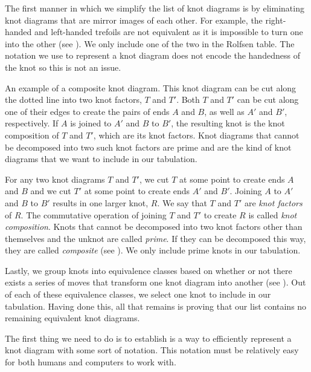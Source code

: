 \begin{paper}
The first manner in which we simplify the list of knot diagrams is by
eliminating knot diagrams that are mirror images of each other.
For example, the right-handed and left-handed trefoils are not equivalent as it
is impossible to turn one into the other (see \figTrefoil).
We only include one of the two in the Rolfsen table.
The notation we use to represent a knot diagram does not encode the handedness
of the knot so this is not an issue.\\

{\begin{center}\end{center}\vspace{-1em}}
{An example of a composite knot diagram.
This knot diagram can be cut along the dotted line into two knot factors, $T$
and $T'$.
Both $T$ and $T'$ can be cut along one of their edges to create the pairs of
ends $A$ and $B$, as well as $A'$ and $B'$, respectively.
If $A$ is joined to $A'$ and $B$ to $B'$, the resulting knot is the knot
composition of $T$ and $T'$, which are its knot factors.
Knot diagrams that cannot be decomposed into two such knot factors are prime and
are the kind of knot diagrams that we want to include in our tabulation.}

For any two knot diagrams $T$ and $T'$, we cut $T$ at some point to create ends
$A$ and $B$ and we cut $T'$ at some point to create ends $A'$ and $B'$.
Joining $A$ to $A'$ and $B$ to $B'$ results in one larger knot, $R$.
We say that $T$ and $T'$ are \textit{knot factors} of $R$.
The commutative operation of joining $T$ and $T'$ to create $R$ is called
\textit{knot composition}.
Knots that cannot be decomposed into two knot factors other than themselves and
the unknot are called \textit{prime}.
If they can be decomposed this way, they are called \textit{composite}
(see \figComposite).
We only include prime knots in our tabulation.

Lastly, we group knots into equivalence classes based on whether or not there
exists a series of moves that transform one knot diagram into another (see
\figMoves).
Out of each of these equivalence classes, we select one knot to include in our
tabulation.
Having done this, all that remains is proving that our list contains no
remaining equivalent knot diagrams.


The first thing we need to do is to establish is a way to efficiently represent
a knot diagram with some sort of notation.
This notation must be relatively easy for both humans and computers to work
with.


\end{paper}
